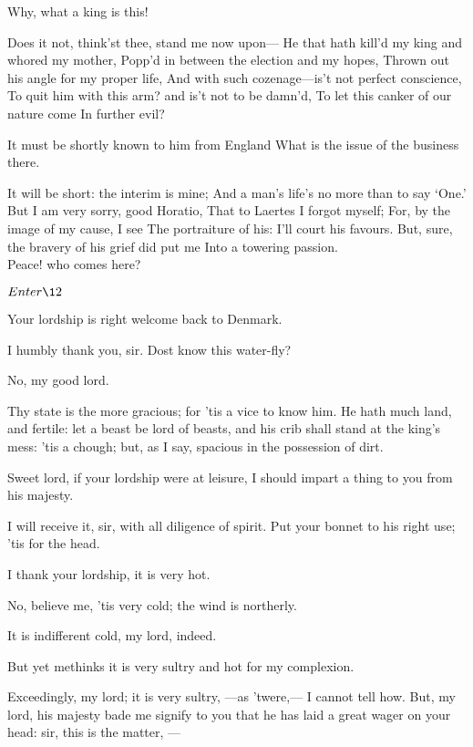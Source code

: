 \documentclass[11pt]{book}
\begin{document}
\6	Why, what a king is this!

\1	Does it not, think'st thee, stand me now upon---
	He that hath kill'd my king and whored my mother,
	Popp'd in between the election and my hopes,
	Thrown out his angle for my proper life,
	And with such cozenage---is't not perfect conscience,
	To quit him with this arm? and is't not to be damn'd,
	To let this canker of our nature come
	In further evil?

\6	It must be shortly known to him from England
	What is the issue of the business there.

\1	It will be short: the interim is mine;
	And a man's life's no more than to say `One.'
	But I am very sorry, good Horatio,
	That to Laertes I forgot myself;
	For, by the image of my cause, I see
	The portraiture of his: I'll court his favours.
	But, sure, the bravery of his grief did put me
	Into a towering passion. \\

\6	Peace! who comes here?

	\(Enter \12\)

\Prosa

	Your lordship is right welcome back to Denmark.

\1	I humbly thank you, sir. Dost know this water-fly?

\6	No, my good lord.

\1	Thy state is the more gracious; for 'tis a vice to
	know him. He hath much land, and fertile: let a
	beast be lord of beasts, and his crib shall stand at
	the king's mess: 'tis a chough; but, as I say,
	spacious in the possession of dirt.

	Sweet lord, if your lordship were at leisure, I
	should impart a thing to you from his majesty.

\1	I will receive it, sir, with all diligence of
	spirit. Put your bonnet to his right use; 'tis for the head.

	I thank your lordship, it is very hot.

\1	No, believe me, 'tis very cold; the wind is
	northerly.

	It is indifferent cold, my lord, indeed.

\1	But yet methinks it is very sultry and hot for my
	complexion.

  \DriveOut* Exceedingly, my lord; it is very sultry, ---as
	'twere,--- I cannot tell how. But, my lord, his
	majesty bade me signify to you that he has laid a
	great wager on your head: sir, this is the matter, ---
\end{document}
